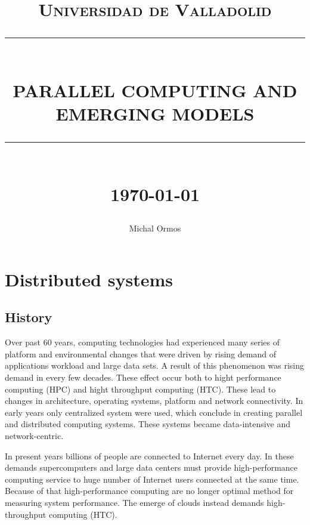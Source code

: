 \documentclass[12pt]{report}
\newcommand{\HRule}[1]{\rule{\linewidth}{#1}}
\begin{document}
\title{ \normalsize \textsc{Universidad de Valladolid}
		\\ [2.0cm]
		\HRule{0.5pt} \\
		\LARGE \textbf{\uppercase{Parallel computing and emerging models}}
		\HRule{2pt} \\ [0.5cm]
		\normalsize \today \vspace*{5\baselineskip}}

\date{}

\author{
		Michal Ormos}

\maketitle
\newpage

\tableofcontents




\chapter{Distributed systems}
	\section{History}
		Over past 60 years, computing technologies had experienced many series of platform and environmental changes that were driven by rising demand of applications workload and large data sets. A result of this phenomenon was rising demand in every few decades. These effect occur both to hight performance computing (HPC) and hight throughput computing (HTC).
        These lead to changes in architecture, operating systems, platform and network connectivity.
        In early years only centralized system were used, which conclude in creating parallel and distributed computing systems. These systems became data-intensive and network-centric.
        
        In present years billions of people are connected to Internet every day. In these demands supercomputers and large data centers must provide high-performance computing service to huge number of Internet users connected at the same time. Because of that high-performance computing are no longer optimal method for measuring system performance. The emerge of clouds instead demands high-throughput computing (HTC).
        
\end{document}
